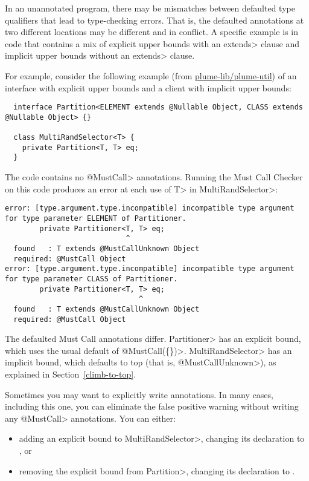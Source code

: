 

In an unannotated program, there may be mismatches between defaulted type
qualifiers that lead to type-checking errors.  That is, the defaulted
annotations at two different locations may be different and in conflict.  A
specific example is in code that contains a mix of explicit upper bounds
with an \<extends> clause and implicit upper bounds without an \<extends>
clause.

For example, consider the following example (from
\href{https://github.com/plume-lib/plume-util}{plume-lib/plume-util}) of an
interface with explicit upper bounds and a client with implicit upper
bounds:
\begin{Verbatim}
  interface Partition<ELEMENT extends @Nullable Object, CLASS extends @Nullable Object> {}

  class MultiRandSelector<T> {
    private Partition<T, T> eq;
  }
\end{Verbatim}

The code contains no \<@MustCall> annotations.
Running the Must Call Checker on this code produces an error at each use
of \<T> in \<MultiRandSelector>:

\begin{smaller}
\begin{Verbatim}
error: [type.argument.type.incompatible] incompatible type argument for type parameter ELEMENT of Partitioner.
        private Partitioner<T, T> eq;
                            ^
  found   : T extends @MustCallUnknown Object
  required: @MustCall Object
error: [type.argument.type.incompatible] incompatible type argument for type parameter CLASS of Partitioner.
        private Partitioner<T, T> eq;
                               ^
  found   : T extends @MustCallUnknown Object
  required: @MustCall Object
\end{Verbatim}
\end{smaller}

The defaulted Must Call annotations differ.
\<Partitioner> has an explicit bound, which uses the usual default of \<@MustCall(\{\})>.
\<MultiRandSelector> has an implicit bound, which defaults to top (that is,
\<@MustCallUnknown>), as explained in Section~\ref{climb-to-top}.

Sometimes you may want to explicitly write annotations.
In many cases, including this one, you can eliminate the false positive
warning without writing any \<@MustCall> annotations.
You can either:
\begin{itemize}
\item
  adding an explicit bound to \<MultiRandSelector>, changing its declaration to
  , or
\item removing the explicit bound from \<Partition>, changing its declaration to
  .
\end{itemize}

